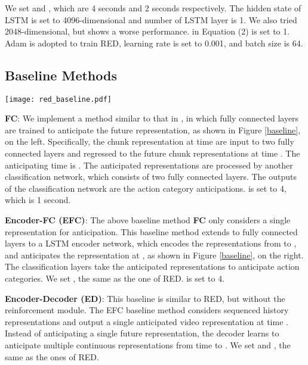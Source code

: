 \documentclass{bmvc2k}
\begin{document}
We set  and , which are 4 seconds and 2 seconds respectively. The hidden state of LSTM is set to 4096-dimensional and number of LSTM layer is 1. We also tried 2048-dimensional, but shows a worse performance.  in Equation (2) is set to 1. Adam \cite{kingma2014adam} is adopted to train RED, learning rate is set to 0.001, and batch size is 64.


\subsection{Baseline Methods}


\begin{figure*}[h]
\centering
\texttt{[image: red\_baseline.pdf]}
\caption{Baseline methods for action anticipation. The left one is FC and the right one is EFC.}
\label{baseline}
\end{figure*}

\textbf{FC}: We implement a method similar to that in \cite{vondrick2016anticipating}, in which fully connected layers are trained to anticipate the future representation, as shown in Figure \ref{baseline}, on the left. Specifically, the chunk representation at time  are input to two fully connected layers and regressed to the future chunk representations at time . The anticipating time is . The anticipated representations are processed by another classification network, which consists of two fully connected layers. The outputs of the classification network are the action category anticipations.  is set to 4, which is 1 second.

\textbf{Encoder-FC (EFC)}: The above baseline method \textbf{FC} only considers a single representation for anticipation. This baseline method extends to fully connected layers to a LSTM encoder network, which encodes the representations from  to , and  anticipates the representation at , as shown in Figure \ref{baseline}, on the right. The classification layers take the anticipated representations to anticipate action categories. We set , the same as the one of RED.  is set to 4.

\textbf{Encoder-Decoder (ED)}: This baseline is similar to RED, but without the reinforcement module. The EFC baseline method considers sequenced history representations and output a single anticipated video representation at time . Instead of anticipating a single future representation, the decoder learns to anticipate multiple continuous representations from time  to . We set  and , the same as the ones of RED.
\end{document}

